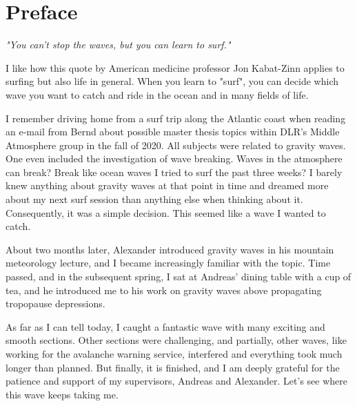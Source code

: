 \chapter*{Preface}
\thispagestyle{plain}
%
%
%
\textit{"You can't stop the waves, but you can learn to surf."}
%

I like how this quote by American medicine professor Jon Kabat-Zinn applies to surfing but also life in general. When you learn to "surf", you can decide which wave you want to catch and ride in the ocean and in many fields of life. 

I remember driving home from a surf trip along the Atlantic coast when reading an e-mail from Bernd about possible master thesis topics within DLR's Middle Atmosphere group in the fall of 2020. All subjects were related to gravity waves. One even included the investigation of wave breaking. Waves in the atmosphere can break? Break like ocean waves I tried to surf the past three weeks? I barely knew anything about gravity waves at that point in time and dreamed more about my next surf session than anything else when thinking about it. Consequently, it was a simple decision. This seemed like a wave I wanted to catch.

About two months later, Alexander introduced gravity waves in his mountain meteorology lecture, and I became increasingly familiar with the topic. Time passed, and in the subsequent spring, I sat at Andreas' dining table with a cup of tea, and he introduced me to his work on gravity waves above propagating tropopause depressions. 

As far as I can tell today, I caught a fantastic wave with many exciting and smooth sections. Other sections were challenging, and partially, other waves, like working for the avalanche warning service, interfered and everything took much longer than planned. But finally, it is finished, and I am deeply grateful for the patience and support of my supervisors, Andreas and Alexander. Let's see where this wave keeps taking me.



